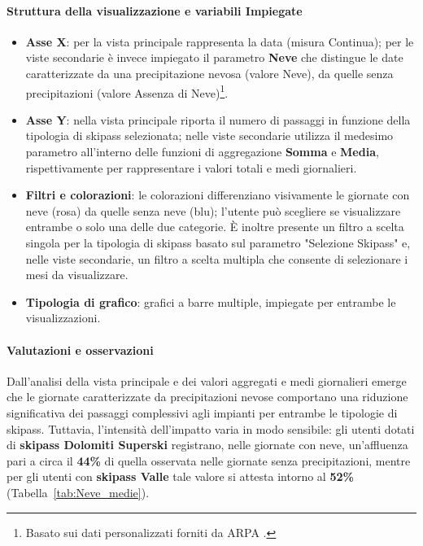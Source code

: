 \paragraph{Struttura della visualizzazione e variabili Impiegate}
\begin{itemize}
    \item \textbf{Asse X}: per la vista principale rappresenta la data (misura Continua); per le viste secondarie è invece impiegato il parametro \textbf{Neve} che distingue le date caratterizzate da una precipitazione nevosa (valore Neve), da quelle senza precipitazioni (valore Assenza di Neve)\footnote{Basato sui dati personalizzati forniti da ARPA \cite{ARPAV_private}.}.
    \item \textbf{Asse Y}: nella vista principale riporta il numero di passaggi in funzione della tipologia di skipass selezionata; nelle viste secondarie utilizza il medesimo parametro all’interno delle funzioni di aggregazione \textbf{Somma} e \textbf{Media}, rispettivamente per rappresentare i valori totali e medi giornalieri.
    \item \textbf{Filtri e colorazioni}: le colorazioni differenziano visivamente le giornate con neve (rosa) da quelle senza neve (blu); l’utente può scegliere se visualizzare entrambe o solo una delle due categorie. È inoltre presente un filtro a scelta singola per la tipologia di skipass basato sul parametro "Selezione Skipass" e, nelle viste secondarie, un filtro a scelta multipla che consente di selezionare i mesi da visualizzare.
    \item \textbf{Tipologia di grafico}: grafici a barre multiple, impiegate per entrambe le visualizzazioni.
\end{itemize}

\paragraph{Valutazioni e osservazioni}

Dall’analisi della vista principale e dei valori aggregati e medi giornalieri emerge che le giornate caratterizzate da precipitazioni nevose comportano una riduzione significativa dei passaggi complessivi agli impianti per entrambe le tipologie di skipass.
Tuttavia, l’intensità dell’impatto varia in modo sensibile: gli utenti dotati di \textbf{skipass Dolomiti Superski} registrano, nelle giornate con neve, un’affluenza pari a circa il \textbf{44\%} di quella osservata nelle giornate senza precipitazioni, mentre per gli utenti con \textbf{skipass Valle} tale valore si attesta intorno al \textbf{52\%} (Tabella~\ref{tab:Neve_medie}).

